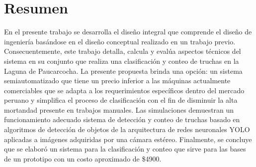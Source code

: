 
\newpage
\clearpage{\pagestyle{empty}\cleardoublepage}
\newpage

\pagestyle{empty}
\newpage
\chapter*{\centering \large Resumen} 


En el presente trabajo se desarrolla el diseño integral que comprende el diseño de ingeniería basándose en el diseño conceptual realizado en un trabajo previo. Consecuentemente, este trabajo detalla, calcula y evalúa aspectos técnicos del sistema en su conjunto que realiza una clasificación y conteo de truchas en la Laguna de Paucarcocha. La presente propuesta brinda una opción: un sistema semiautomatizado que tiene un precio inferior a las máquinas actualmente comerciables que se adapta a los requerimientos específicos dentro del mercado peruano y simplifica el proceso de clasificación con el fin de disminuir la alta mortandad presente en trabajos manuales. Las simulaciones demuestran un funcionamiento adecuado sistema de detección y conteo de truchas basado en algoritmos de detección de objetos de la arquitectura de redes neuronales YOLO aplicadas a imágenes adquiridas por una cámara estéreo. Finalmente, se concluye que se elaboró un sistema para la clasificación y conteo que sirve para las bases de un prototipo con un costo aproximado de \$4900.




